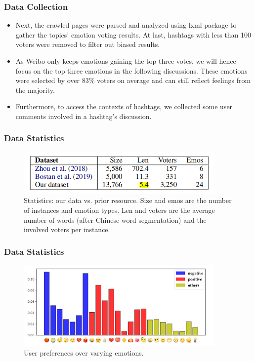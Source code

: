 \documentclass[10pt,aspectratio=43]{beamer}
\begin{document}
    \begin{frame}
        \frametitle{\textbf{Data Collection}}
        \begin{itemize}
            \item Next, the crawled pages were parsed and analyzed using lxml package to gather the topics’ emotion voting results. At last, hashtags with less than 100 voters were removed to filter out biased results.
            \item As Weibo only keeps emotions gaining the top three votes, we will hence focus on the top three emotions in the following discussions. These emotions were selected by over 83\% voters on average and can still reflect feelings from the majority.
            \item Furthermore, to access the contexts of hashtags, we collected some user comments involved in a hashtag’s discussion.
        \end{itemize}
    \end{frame}
    
    \begin{frame}
        \frametitle{\textbf{Data Statistics}}
        \begin{figure}
            \centering
            \includegraphics[width=4in]{figures/stat.png}
            \caption{Statistics: our data vs. prior resource. Size and emos are the number of instances and emotion types. Len and voters are the average number of words (after Chinese word segmentation) and the involved voters per instance.}
            \label{fig:stat}
        \end{figure}
    \end{frame}

    \begin{frame}
        \frametitle{\textbf{Data Statistics}}
        \begin{figure}
            \centering
            \includegraphics[width=4in]{figures/stat2.png}
            \caption{User preferences over varying emotions.}
            \label{fig:stat2}
        \end{figure}
    \end{frame}
    
\end{document}
